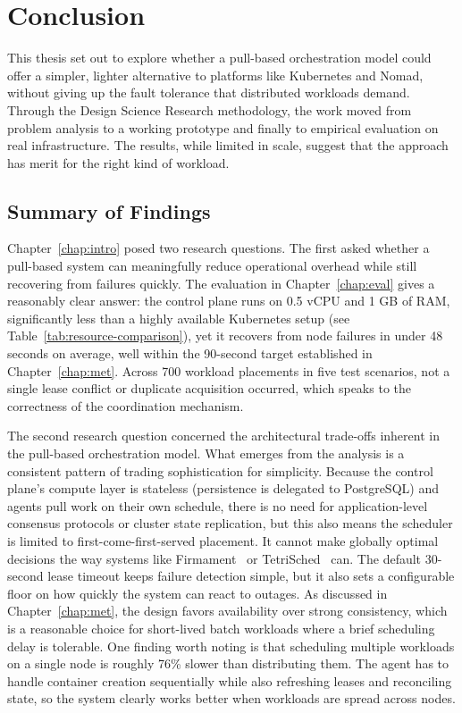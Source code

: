 \chapter{Conclusion}
\label{chap:conclusion}

This thesis set out to explore whether a pull-based orchestration model could offer a simpler, lighter alternative to platforms like Kubernetes and Nomad, without giving up the fault tolerance that distributed workloads demand. Through the Design Science Research methodology, the work moved from problem analysis to a working prototype and finally to empirical evaluation on real infrastructure. The results, while limited in scale, suggest that the approach has merit for the right kind of workload.

\section{Summary of Findings}

Chapter~\ref{chap:intro} posed two research questions. The first asked whether a pull-based system can meaningfully reduce operational overhead while still recovering from failures quickly. The evaluation in Chapter~\ref{chap:eval} gives a reasonably clear answer: the control plane runs on 0.5 vCPU and 1 GB of RAM, significantly less than a highly available Kubernetes setup (see Table~\ref{tab:resource-comparison}), yet it recovers from node failures in under 48 seconds on average, well within the 90-second target established in Chapter~\ref{chap:met}. Across 700 workload placements in five test scenarios, not a single lease conflict or duplicate acquisition occurred, which speaks to the correctness of the coordination mechanism.

The second research question concerned the architectural trade-offs inherent in the pull-based orchestration model. What emerges from the analysis is a consistent pattern of trading sophistication for simplicity. Because the control plane's compute layer is stateless (persistence is delegated to PostgreSQL) and agents pull work on their own schedule, there is no need for application-level consensus protocols or cluster state replication, but this also means the scheduler is limited to first-come-first-served placement. It cannot make globally optimal decisions the way systems like Firmament~\cite{gog2016firmament} or TetriSched~\cite{tumanov2016tetrisched} can. The default 30-second lease timeout keeps failure detection simple, but it also sets a configurable floor on how quickly the system can react to outages. As discussed in Chapter~\ref{chap:met}, the design favors availability over strong consistency, which is a reasonable choice for short-lived batch workloads where a brief scheduling delay is tolerable. One finding worth noting is that scheduling multiple workloads on a single node is roughly 76\% slower than distributing them. The agent has to handle container creation sequentially while also refreshing leases and reconciling state, so the system clearly works better when workloads are spread across nodes.

